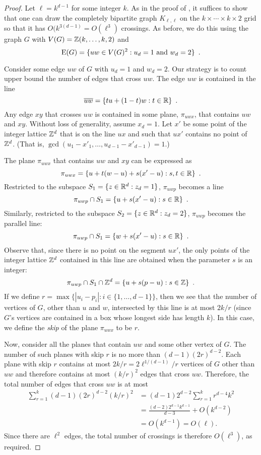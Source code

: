 \documentclass{patmorin}
\begin{document}
\begin{proof}
Let $\ell=k^{d-1}$ for some integer $k$.  As in the proof of
, it suffices to show that one can
draw the completely bipartite graph $K_{\ell,\ell}$ on the
$k\times\cdots\times k\times 2$ grid so that it has
$O(k^{3(d-1)}=O(\ell^3)$ crossings.  As before, we do this using the graph
$G$ with $V(G)=\mathbb{Z}(k,\ldots,k,2)$ and
\[
  \mathrm{E}(G) = \{ uw\in V(G)^2 :\mbox{$u_d = 1$ and $w_d = 2$} \} \enspace .
\]

Consider some edge $uw$ of $G$ with $u_d=1$ and $w_d=2$.  Our strategy
is to count upper bound the number of edges that cross $uw$.  
The edge $uw$ is contained in the line
\[  \overline{uw} = \{ tu + (1-t)w : t\in \mathbb{R} \} \enspace . \]
Any edge $xy$ that crosses $uw$ is contained in some plane, $\pi_{uwx}$,
that contains $uw$ and $xy$.  Without loss of generality, assume $x_d=1$.
Let $x'$ be some point of the integer lattice $\mathbb{Z}^d$ that is on the
line $ux$ and such that $ux'$ contains no point of $\mathbb{Z}^d$. (That is,
$\gcd(u_1-x'_1,\ldots,u_{d-1}-x'_{d-1}) = 1$.)

The plane $\pi_{uwx}$ that contains $uw$ and $xy$ can be expressed as
\[
   \pi_{uwx} = \{ u + t(w-u) + s(x'-u) : s,t\in\mathbb{R}\} \enspace .
\]
Restricted to the subspace $S_1=\{z\in\mathbb{R}^d: z_d=1\}$, $\pi_{uwp}$ becomes a line
\[
   \pi_{uwp}\cap S_1 = \{ u + s(x'-u) : s\in\mathbb{R}\} \enspace .
\]
Similarly, restricted to the subspace $S_2=\{z\in\mathbb{R}^d: z_d=2\}$, $\pi_{uwp}$
becomes the parallel line:
\[
   \pi_{uwp}\cap S_1 = \{ w + s(x'-u) : s\in\mathbb{R}\} \enspace .
\]
Observe that, since there is no point on the segment $ux'$, the only points
of the integer lattice $\mathbb{Z}^d$ contained in this line are obtained when
the parameter $s$ is an integer:
\[
   \pi_{uwp}\cap S_1\cap\mathbb{Z}^d = \{ u + s(p-u) : s\in\mathbb{Z}\} \enspace .
\]
If we define $r=\max\{|u_i-p_i| : i\in\{1,\ldots,d-1\}\}$, then we see
that the number of vertices of $G$, other than $u$ and $w$, intersected
by this line is at most $2k/r$ (since $G$'s vertices are contained in
a box whose longest side has length $k$).  In this case, we define the
\emph{skip} of the plane $\pi_{uwx}$ to be $r$.

Now, consider all the planes that contain $uw$ and some other
vertex of $G$.  The number of such planes with skip $r$ is no more
than $(d-1)(2r)^{d-2}$.  Each plane with skip $r$ contains at most
$2k/r=2\ell^{1/(d-1)}/r$ vertices of $G$ other than $uw$ and therefore
contains at most $(k/r)^2$ edges that cross $uw$.  Therefore, the total
number of edges that cross $uw$ is at most
\begin{align*}
   \sum_{r=1}^k(d-1)(2r)^{d-2}(k/r)^2 
       & = (d-1)2^{d-2}\sum_{r=1}^k r^{d-4}k^2 \\
       & = \frac{(d-2)2^{d-1}k^{d-1}}{d-3} + O(k^{d-2}) \\
       & = O(k^{d-1}) = O(\ell).
\end{align*}
Since there are $\ell^2$ edges, the total number of crossings is therefore
$O(\ell^3)$, as required.
\end{proof}
\end{document}
